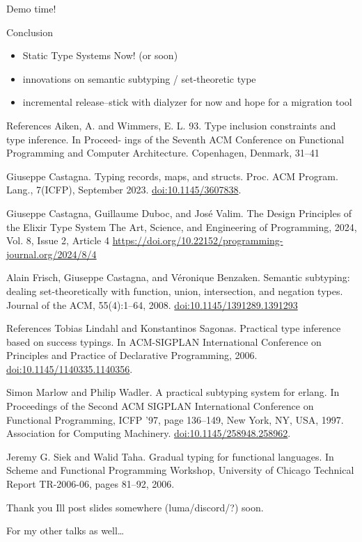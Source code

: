 \documentclass[
  ignorenonframetext,
  aspectratio=169]{beamer}
\providecommand{\tightlist}{%
  \setlength{\itemsep}{0pt}\setlength{\parskip}{0pt}}
\begin{document}
\begin{frame}{Demo time!}
\label{demo-time}
\end{frame}

\begin{frame}{Conclusion}
\label{conclusion}
\begin{itemize}
\tightlist
\item
  Static Type Systems Now! (or soon)
\item
  innovations on semantic subtyping / set-theoretic type
\item
  incremental release--stick with dialyzer for now and hope for a
  migration tool
\end{itemize}
\end{frame}

\begin{frame}{References}
\label{references}
Aiken, A. and Wimmers, E. L. 93. Type inclusion constraints and type
inference. In Proceed- ings of the Seventh ACM Conference on Functional
Programming and Computer Architecture. Copenhagen, Denmark, 31--41

Giuseppe Castagna. Typing records, maps, and structs. Proc. ACM Program.
Lang., 7(ICFP), September 2023. \url{doi:10.1145/3607838}.

Giuseppe Castagna, Guillaume Duboc, and José Valim. The Design
Principles of the Elixir Type System The Art, Science, and Engineering
of Programming, 2024, Vol. 8, Issue 2, Article 4
\url{https://doi.org/10.22152/programming-journal.org/2024/8/4}

Alain Frisch, Giuseppe Castagna, and Véronique Benzaken. Semantic
subtyping: dealing set-theoretically with function, union, intersection,
and negation types. Journal of the ACM, 55(4):1--64, 2008.
\url{doi:10.1145/1391289.1391293}
\end{frame}

\begin{frame}{References}
\label{references-1}
Tobias Lindahl and Konstantinos Sagonas. Practical type inference based
on success typings. In ACM-SIGPLAN International Conference on
Principles and Practice of Declarative Programming, 2006.
\url{doi:10.1145/1140335.1140356}.

Simon Marlow and Philip Wadler. A practical subtyping system for erlang.
In Proceedings of the Second ACM SIGPLAN International Conference on
Functional Programming, ICFP '97, page 136--149, New York, NY, USA,
1997. Association for Computing Machinery.
\url{doi:10.1145/258948.258962}.

Jeremy G. Siek and Walid Taha. Gradual typing for functional languages.
In Scheme and Functional Programming Workshop, University of Chicago
Technical Report TR-2006-06, pages 81--92, 2006.
\end{frame}

\begin{frame}{Thank you}
\label{thank-you}
I\textquotesingle ll post slides somewhere (luma/discord/?) soon.

For my other talks as well\ldots{}
\end{frame}
\end{document}
